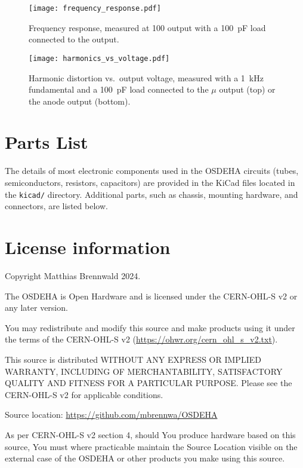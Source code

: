 \begin{figure}
\begin{center}
\texttt{[image: frequency\_response.pdf]}
\caption{Frequency response, measured at \SI{100}{\unitVrms} output with a \SI{100}{pF} load connected to the output.}
\end{center}
\end{figure}

\begin{figure}
\begin{center}
\texttt{[image: harmonics\_vs\_voltage.pdf]}
\caption{Harmonic distortion vs.\ output voltage, measured with a \SI{1}{kHz} fundamental and a \SI{100}{pF} load connected to the $\mu$ output (top) or the anode output (bottom).}
\end{center}
\end{figure}


\section{Parts List}

The details of most electronic components used in the OSDEHA circuits (tubes, semiconductors, resistors, capacitors) are provided in the KiCad files located in the {\tt kicad/} directory.\cite{osdeha_github} Additional parts, such as chassis, mounting hardware, and connectors, are listed below.

{\footnotesize {}}

\clearpage
\section{License information} 
Copyright Matthias Brennwald 2024.                                                    

The OSDEHA is Open Hardware and is licensed under the CERN-OHL-S v2 or any later version.

You may redistribute and modify this source and make products using it under the terms of the CERN-OHL-S v2 (\url{https://ohwr.org/cern_ohl_s_v2.txt}).

This source is distributed WITHOUT ANY EXPRESS OR IMPLIED WARRANTY, INCLUDING OF MERCHANTABILITY, SATISFACTORY QUALITY AND FITNESS FOR A PARTICULAR PURPOSE. Please see the CERN-OHL-S v2 for applicable conditions.

Source location: \url{https://github.com/mbrennwa/OSDEHA}

As per CERN-OHL-S v2 section 4, should You produce hardware based on this source, You must where practicable maintain the Source Location visible on the external case of the OSDEHA or other products you make using this source.            


\clearpage





